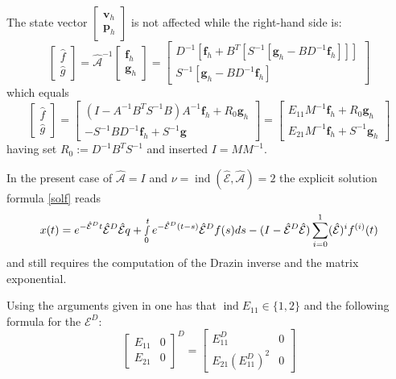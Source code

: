 \documentclass[a4paper,10pt,BCOR=15mm]{scrbook}
\DeclareMathOperator{\ind}{ind}
\begin{document}
The state vector $\begin{bmatrix}\mathbf v_h\\ \mathbf p_h \end{bmatrix}$ is not affected while the right-hand side is:
\begin{equation}\label{fhat}
 \begin{bmatrix} \hat{f} \\ \hat g \end{bmatrix} =\hat {\mathcal A}^{-1}\begin{bmatrix} \mathbf f_h \\ \mathbf g_h \end{bmatrix} = \begin{bmatrix} D^{-1}[\mathbf f_h+B^T[S^{-1}[\mathbf g_h-BD^{-1}\mathbf f_h]]] \\  S^{-1}[\mathbf g_h- BD^{-1} \mathbf f_h] \end{bmatrix} 
\end{equation}
which equals 
\begin{equation*}
 \begin{bmatrix} \hat{f} \\ \hat{g} \end{bmatrix}= \begin{bmatrix} (I-A^{-1}B^TS^{-1}B)A^{-1}\mathbf f_h +R_0 \mathbf g_h \\ -S^{-1}BD^{-1}\mathbf f_h+S^{-1}\mathbf g \end{bmatrix} = \begin{bmatrix} E_{11}M^{-1}\mathbf f_h + R_0 \mathbf g_h \\ E_{21}M^{-1}\mathbf f_h+S^{-1}\mathbf g_h \end{bmatrix}
\end{equation*}
having set $R_0 := D^{-1}B^TS^{-1}$ and inserted $I=MM^{-1}$.

In the present case of $\hat {\mathcal A} = I$ and $\nu = \ind(\hat {\mathcal E},\hat {\mathcal A}) = 2$ the explicit solution formula \eqref{solf} reads
\begin{equation*}
    x(t) = e^{-\hat {\mathcal E}^D t}\hat {\mathcal E}^D\hat {\mathcal E}q+\smallint_0^t e^{-\hat {\mathcal E}^D(t-s)}\hat {\mathcal E}^Df(s) ds - (I-\hat {\mathcal E}^D \hat {\mathcal E}) \sum_{i=0}^{1}(\hat {\mathcal E})^i f^{(i)}(t)
\end{equation*}
and still requires the computation of the Drazin inverse and the matrix exponential.

Using the arguments given in \cite[Lemma 6 and 7]{emme} one has that $\ind E_{11} \in \{1,2\}$ and the following formula for the $\mathcal E^D$:
\begin{equation} \label{edra} 
 \begin{bmatrix} E_{11}& 0 \\ E_{21} & 0 \end{bmatrix}^D = \begin{bmatrix} E_{11}^D & 0 \\ E_{21}(E_{11}^D)^2 & 0 \end{bmatrix}
\end{equation}
\end{document}
